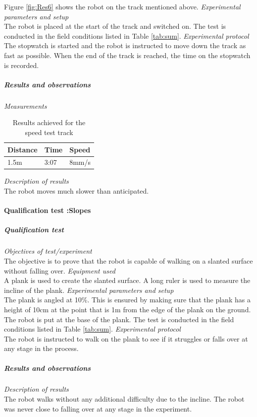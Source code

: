 Figure \ref{fig:Res6} shows the robot on the track mentioned above.
\textit{Experimental parameters and setup }\\
The robot is placed at the start of the track and switched on. The test is conducted in the field conditions listed in Table \ref{tab:sum}.
\textit{Experimental protocol}\\
The stopwatch is started and the robot is instructed to move down the track as fast as possible. When the end of the track is reached, the time on the stopwatch is recorded.
\subparagraph{Results and observations}
\textit{Measurements}\\
\begin{table}[H]
\centering
\begin{tabular}{|l|l|l|}
\hline
\textbf{Distance}&\textbf{Time}&\textbf{Speed}\\\hline
1.5m&3:07&8mm/s\\\hline
\end{tabular}
\caption{Results achieved for the speed test track}
\label{my-label}
\end{table}
\textit{Description of results}\\
The robot moves much slower than anticipated.

\paragraph{Qualification test  :Slopes}
\subparagraph{Qualification test}
\textit{Objectives of test/experiment}\\
The objective is to prove that the robot is capable of walking on a slanted surface without falling over.
\textit{Equipment used}\\
A plank is used to create the slanted surface. A long ruler is used to measure the incline of the plank.
\textit{Experimental parameters and setup }\\
The plank is angled at 10\%. This is ensured by making sure that the plank has a height of 10cm at the point that is 1m from the edge of the plank on the ground. The robot is put at the base of the plank. The test is conducted in the field conditions listed in Table \ref{tab:sum}.
\textit{Experimental protocol}\\
The robot is instructed to walk on the plank to see if it struggles or falls over at any stage in the process.
\subparagraph{Results and observations}
\textit{Description of results}\\
The robot walks without any additional difficulty due to the incline. The robot was never close to falling over at any stage in the experiment.

